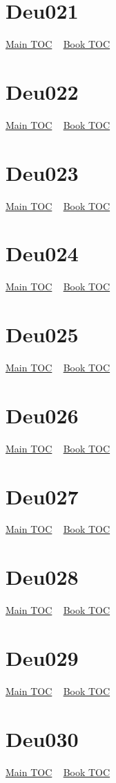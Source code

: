 \documentclass{book}
\begin{document}
  \section{Deu021}\hyperlink{toc}{Main TOC} ~ \hyperref[subsec:Deu]{Book TOC} 
  \section{Deu022}\hyperlink{toc}{Main TOC} ~ \hyperref[subsec:Deu]{Book TOC} 
  \section{Deu023}\hyperlink{toc}{Main TOC} ~ \hyperref[subsec:Deu]{Book TOC} 
  \section{Deu024}\hyperlink{toc}{Main TOC} ~ \hyperref[subsec:Deu]{Book TOC} 
  \section{Deu025}\hyperlink{toc}{Main TOC} ~ \hyperref[subsec:Deu]{Book TOC} 
  \section{Deu026}\hyperlink{toc}{Main TOC} ~ \hyperref[subsec:Deu]{Book TOC} 
  \section{Deu027}\hyperlink{toc}{Main TOC} ~ \hyperref[subsec:Deu]{Book TOC} 
  \section{Deu028}\hyperlink{toc}{Main TOC} ~ \hyperref[subsec:Deu]{Book TOC} 
  \section{Deu029}\hyperlink{toc}{Main TOC} ~ \hyperref[subsec:Deu]{Book TOC} 
  \section{Deu030}\hyperlink{toc}{Main TOC} ~ \hyperref[subsec:Deu]{Book TOC} 
\end{document}
